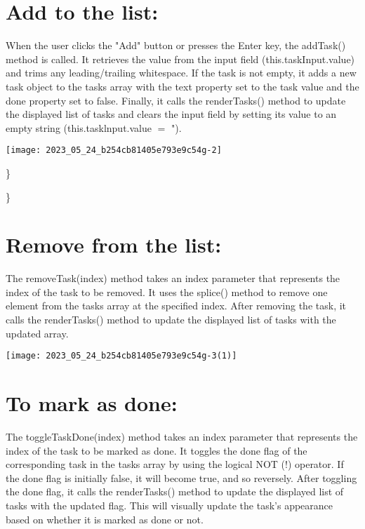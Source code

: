 \documentclass[10pt]{article}
\begin{document}
\section{Add to the list:}
When the user clicks the "Add" button or presses the Enter key, the addTask() method is called. It retrieves the value from the input field (this.taskInput.value) and trims any leading/trailing whitespace. If the task is not empty, it adds a new task object to the tasks array with the text property set to the task value and the done property set to false. Finally, it calls the renderTasks() method to update the displayed list of tasks and clears the input field by setting its value to an empty string (this.tasklnput.value $=$ ").

\begin{center}
\texttt{[image: 2023\_05\_24\_b254cb81405e793e9c54g-2]}
\end{center}

\}

\}

\section{Remove from the list:}
The removeTask(index) method takes an index parameter that represents the index of the task to be removed. It uses the splice() method to remove one element from the tasks array at the specified index. After removing the task, it calls the renderTasks() method to update the displayed list of tasks with the updated array.

\begin{center}
\texttt{[image: 2023\_05\_24\_b254cb81405e793e9c54g-3(1)]}
\end{center}

\section{To mark as done:}
The toggleTaskDone(index) method takes an index parameter that represents the index of the task to be marked as done. It toggles the done flag of the corresponding task in the tasks array by using the logical NOT (!) operator. If the done flag is initially false, it will become true, and so reversely. After toggling the done flag, it calls the renderTasks() method to update the displayed list of tasks with the updated flag. This will visually update the task's appearance based on whether it is marked as done or not.
\end{document}
